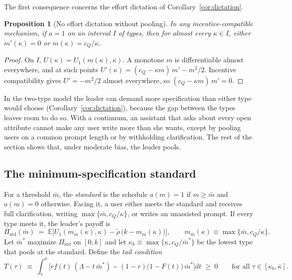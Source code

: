 \documentclass[11pt]{article}
\newtheorem{proposition}{Proposition}
\begin{document}
The first consequence concerns the effort dictation of Corollary~\ref{cor:dictation}.

\begin{proposition}[No effort dictation without pooling]
\label{prop:nodictation}
In any incentive-compatible mechanism, if $a = 1$ on an interval $I$ of types, then for almost every $\kappa \in I$, either $m'(\kappa) = 0$ or $m(\kappa) = c_Q/\kappa$.
\end{proposition}

\begin{proof}
On $I$, $U(\kappa) = U_1(m(\kappa),\kappa)$. A monotone $m$ is differentiable almost everywhere, and at such points $U'(\kappa) = (c_Q - \kappa m)\,m' - m^2/2$. Incentive compatibility gives $U' = -m^2/2$ almost everywhere, so $(c_Q - \kappa m)\,m' = 0$.
\end{proof}

In the two-type model the leader can demand more specification than either type would choose (Corollary~\ref{cor:dictation}), because the gap between the types leaves room to do so. With a continuum, an assistant that asks about every open attribute cannot make any user write more than she wants, except by pooling users on a common prompt length or by withholding clarification. The rest of the section shows that, under moderate bias, the leader pools.

\subsection{The minimum-specification standard}

For a threshold $\bar m$, the \emph{standard} is the schedule $a(m) = 1$ if $m \ge \bar m$ and $a(m) = 0$ otherwise. Facing it, a user either meets the standard and receives full clarification, writing $\max\{\bar m, c_Q/\kappa\}$, or writes an unassisted prompt. If every type meets it, the leader's payoff is
\[
\Pi_{\text{std}}(\bar m) \;=\; \mathbb{E}\Big[ U_1(m_{\bar m}(\kappa),\kappa) - \tilde\rho\,\big(k - m_{\bar m}(\kappa)\big) \Big], \qquad m_{\bar m}(\kappa) \equiv \max\{\bar m, c_Q/\kappa\}.
\]
Let $\bar m^*$ maximize $\Pi_{\text{std}}$ on $[0,k]$ and let $\kappa_b \equiv \max\{\underline\kappa, c_Q/\bar m^*\}$ be the lowest type that pools at the standard. Define the \emph{tail condition}
\[
T(\tau) \;\equiv\; \int_\tau^{\bar\kappa} \Big[ r f(t)\,(\Lambda - t\,\bar m^*) - (1-r)\big(1 - F(t)\big)\,\bar m^* \Big] dt \;\ge\; 0 \qquad \text{for all } \tau \in [\kappa_b, \bar\kappa].
\]
\end{document}

